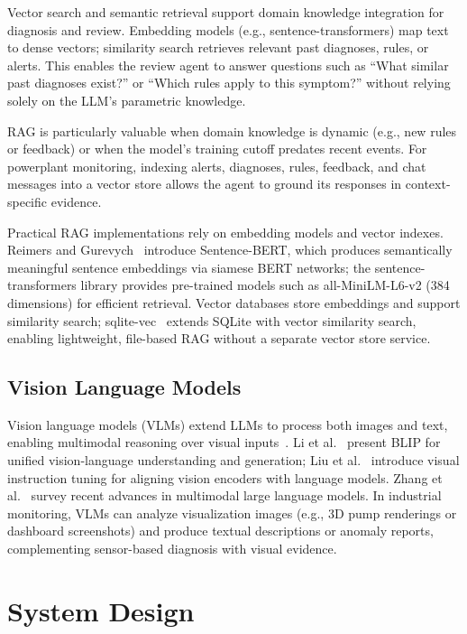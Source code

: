\documentclass[12pt,letterpaper]{report}
\begin{document}
Vector search and semantic retrieval support domain knowledge integration for diagnosis and review. Embedding models (e.g., sentence-transformers) map text to dense vectors; similarity search retrieves relevant past diagnoses, rules, or alerts. This enables the review agent to answer questions such as ``What similar past diagnoses exist?'' or ``Which rules apply to this symptom?'' without relying solely on the LLM's parametric knowledge.

RAG is particularly valuable when domain knowledge is dynamic (e.g., new rules or feedback) or when the model's training cutoff predates recent events. For powerplant monitoring, indexing alerts, diagnoses, rules, feedback, and chat messages into a vector store allows the agent to ground its responses in context-specific evidence.

Practical RAG implementations rely on embedding models and vector indexes. Reimers and Gurevych~\cite{reimers2019sentence} introduce Sentence-BERT, which produces semantically meaningful sentence embeddings via siamese BERT networks; the sentence-transformers library provides pre-trained models such as all-MiniLM-L6-v2 (384 dimensions) for efficient retrieval. Vector databases store embeddings and support similarity search; sqlite-vec~\cite{sqlitevec2024} extends SQLite with vector similarity search, enabling lightweight, file-based RAG without a separate vector store service.

\section{Vision Language Models}

Vision language models (VLMs) extend LLMs to process both images and text, enabling multimodal reasoning over visual inputs~\cite{li2022blip,liu2023llava,zhang2024mmllms}. Li et al.~\cite{li2022blip} present BLIP for unified vision-language understanding and generation; Liu et al.~\cite{liu2023llava} introduce visual instruction tuning for aligning vision encoders with language models. Zhang et al.~\cite{zhang2024mmllms} survey recent advances in multimodal large language models. In industrial monitoring, VLMs can analyze visualization images (e.g., 3D pump renderings or dashboard screenshots) and produce textual descriptions or anomaly reports, complementing sensor-based diagnosis with visual evidence.

\chapter{System Design}
\label{ch:design}
\end{document}
